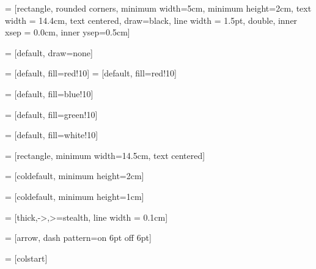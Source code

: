 {
}

 = [rectangle, rounded corners, minimum width=5cm, minimum height=2cm, text width = 14.4cm, text centered, draw=black, line width = 1.5pt, double, inner xsep = 0.0cm, inner ysep=0.5cm]

 = [default, draw=none]

 = [default, fill=red!10]
 = [default, fill=red!10]

 = [default, fill=blue!10]

 = [default, fill=green!10]

 = [default, fill=white!10]

 = [rectangle, minimum width=14.5cm, text centered]

 = [coldefault, minimum height=2cm]

 = [coldefault, minimum height=1cm]

 = [thick,->,>=stealth, line width = 0.1cm]

 = [arrow, dash pattern=on 6pt off 6pt]

\newcommand{\addtitle}[2]{
\begin{tabularx}{\textwidth}{XX}
\Huge \textbf{#1} &\raggedleft \Huge \textbf{By #2}\\
~\\
~\\
\end{tabularx}
}

\newcommand{\strategytitle}[2]{
	\begin{tabularx}{\textwidth}{Xr}
		\Huge \textbf{#1}
		~\\
		~\\
	\end{tabularx}
}

 = [colstart]

